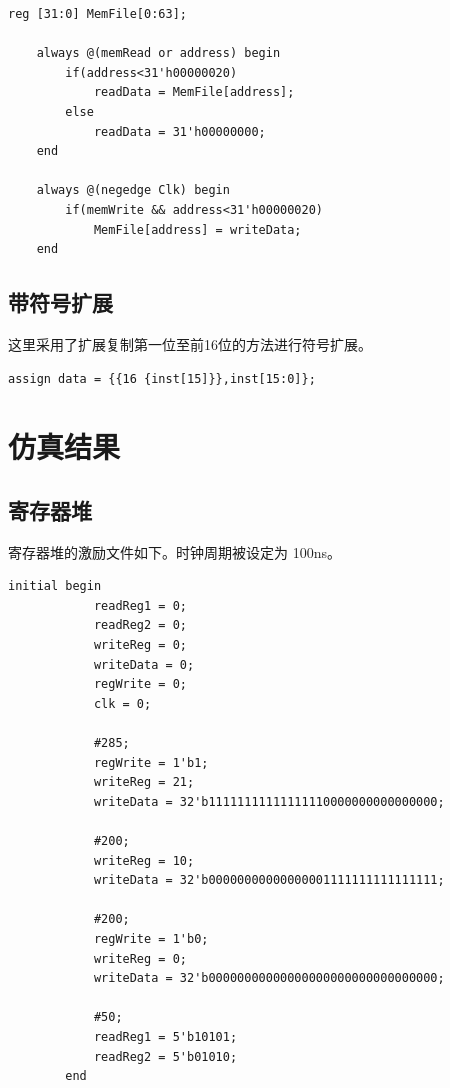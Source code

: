 \documentclass[a4paper,UTF8]{ctexart}
\begin{document}
\begin{lstlisting}[caption=dataMemory.v]
    reg [31:0] MemFile[0:63];

    always @(memRead or address) begin
        if(address<31'h00000020)
            readData = MemFile[address];
        else 
            readData = 31'h00000000;
    end

    always @(negedge Clk) begin
        if(memWrite && address<31'h00000020)
            MemFile[address] = writeData;
    end
\end{lstlisting}

\subsection{带符号扩展}

这里采用了扩展复制第一位至前16位的方法进行符号扩展。

\begin{lstlisting}[caption=signext.v]
    assign data = {{16 {inst[15]}},inst[15:0]};
\end{lstlisting}

\section{仿真结果}

\subsection{寄存器堆}

寄存器堆的激励文件如下。时钟周期被设定为 100ns。
    \begin{lstlisting}[caption=Registers\_tb.v,basicstyle=\ttfamily\scriptsize]
        initial begin
            readReg1 = 0;
            readReg2 = 0;
            writeReg = 0;
            writeData = 0;
            regWrite = 0;
            clk = 0;
    
            #285;
            regWrite = 1'b1;
            writeReg = 21;
            writeData = 32'b11111111111111110000000000000000;
    
            #200;
            writeReg = 10;
            writeData = 32'b00000000000000001111111111111111;
    
            #200;
            regWrite = 1'b0;
            writeReg = 0;
            writeData = 32'b00000000000000000000000000000000;
    
            #50;
            readReg1 = 5'b10101;
            readReg2 = 5'b01010;
        end
    \end{lstlisting}
\end{document}
